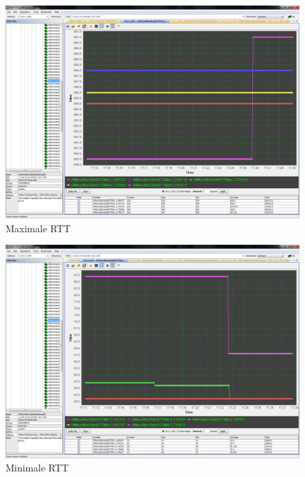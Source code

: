 \documentclass[a4paper,10pt]{scrartcl}
\begin{document}
\begin{figure}[h]
 \centering
 \includegraphics[width=\textwidth]{./Bilder/C/rttmax.png}
 \caption{Maximale RTT}
\end{figure}

\begin{figure}[h]
 \centering
 \includegraphics[width=\textwidth]{./Bilder/C/rttmin.png}
 \caption{Minimale RTT}
\end{figure}
\end{document}
